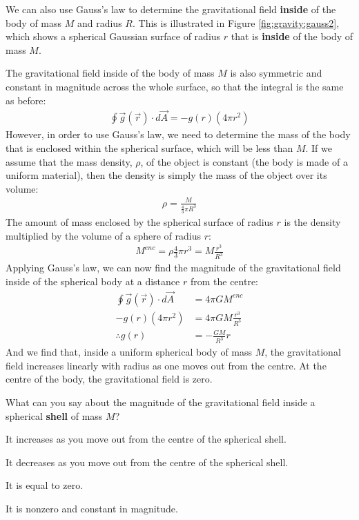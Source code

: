 We can also use Gauss's law to determine the gravitational field \textbf{inside} of the body of mass $M$ and radius $R$. This is illustrated in Figure \ref{fig:gravity:gauss2}, which shows a spherical Gaussian surface of radius $r$ that is \textbf{inside} of the body of mass $M$.

The gravitational field inside of the body of mass $M$ is also symmetric 
and  constant in magnitude across the whole surface, %
so that the integral is the same as before:
\begin{align*}
\oint \vec g(\vec r) \cdot d\vec A=-g(r)(4\pi r^2)
\end{align*}
However, in order to use Gauss's law, we need to determine the mass of the body that is enclosed within the spherical surface, which will be less than $M$. If we assume that the mass density, $\rho$, of the object is constant (the body is made of a uniform material), then the density is simply the mass of the object over its volume:
\begin{align*}
\rho = \frac{M}{\frac{4}{3}\pi R^3}
\end{align*}
The amount of mass enclosed by the spherical surface of radius $r$ is the density multiplied by the volume of a sphere of radius $r$:
\begin{align*}
M^{enc} = \rho \frac{4}{3}\pi r^3 = M\frac{r^3}{R^3}
\end{align*}
Applying Gauss's law, we can now find the magnitude of the gravitational field inside of the spherical body at a distance $r$ from the centre:
\begin{align*}
\oint \vec g(\vec r) \cdot d\vec A &= 4\pi G M^{enc}\\
-g(r)(4\pi r^2) &= 4\pi G M\frac{r^3}{R^3}\\
\therefore g(r) &= - \frac{G M}{R^3}r
\end{align*}
And we find that, inside a uniform spherical body of mass $M$, the gravitational field increases linearly with radius as one moves out from the centre. At the centre of the body, the gravitational field is zero. 

\begin{checkpoint}
\begin{MCquestion}{What can you say about the magnitude of the gravitational field inside a spherical \textbf{shell} of mass $M$?}
\item It increases as you move out from the centre of the spherical shell. 
\item It decreases as you move out from the centre of the spherical shell. 
\item It is equal to zero. \correct
\item It is nonzero and constant in magnitude.
\end{MCquestion}
\end{checkpoint}

